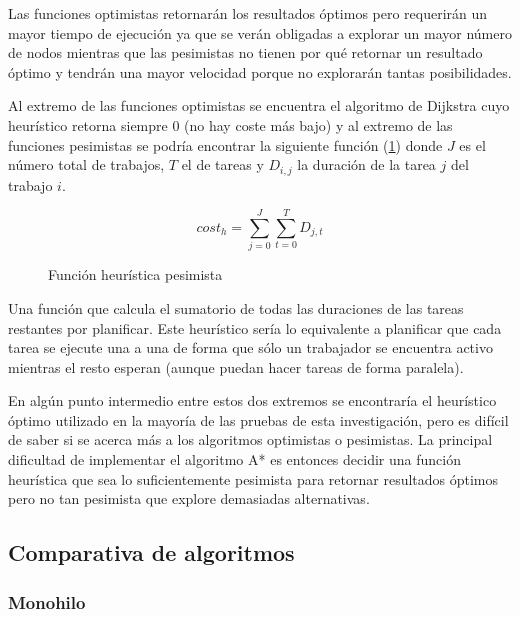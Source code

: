 \vspace{4em}

\begin{keynotebox}
Las funciones optimistas retornarán los resultados óptimos
pero requerirán un mayor tiempo de ejecución ya que
se verán obligadas a explorar un mayor número de nodos
mientras que las pesimistas no tienen por qué retornar un
resultado óptimo y tendrán una mayor velocidad porque
no explorarán tantas posibilidades.
\end{keynotebox}

\pagebreak

Al extremo de las funciones optimistas
se encuentra el algoritmo de Dijkstra
cuyo heurístico retorna siempre 0
(no hay coste más bajo) y
al extremo de las funciones pesimistas se podría encontrar la siguiente
función (\ref{eq:HeuristicoPesimista})
donde $J$ es el número total de trabajos, $T$ el de tareas y $D_{i,j}$
la duración de la tarea $j$ del trabajo $i$.

\begin{figure}[h]
    $$
    cost_h = \sum_{j=0}^{J}{
        \sum_{t=0}^{T}{
            D_{j,t}
        }
    }
    $$
    \caption{Función heurística pesimista}
    \label{eq:HeuristicoPesimista}
\end{figure}

Una función que calcula el sumatorio de todas las duraciones
de las tareas restantes por planificar.
Este heurístico sería lo equivalente a planificar
que cada tarea se ejecute una a una de forma
que sólo un trabajador se encuentra activo mientras
el resto esperan (aunque puedan hacer tareas de forma paralela).

En algún punto intermedio entre estos dos extremos
se encontraría el heurístico óptimo utilizado
en la mayoría de las pruebas de esta investigación,
pero es difícil de saber si se acerca más
a los algoritmos optimistas o pesimistas.
La principal dificultad de implementar el algoritmo A*
es entonces decidir una función heurística
que sea lo suficientemente pesimista para retornar resultados óptimos
pero no tan pesimista que explore demasiadas alternativas.

\pagebreak
\subsection{Comparativa de algoritmos}

\subsubsection{Monohilo}

